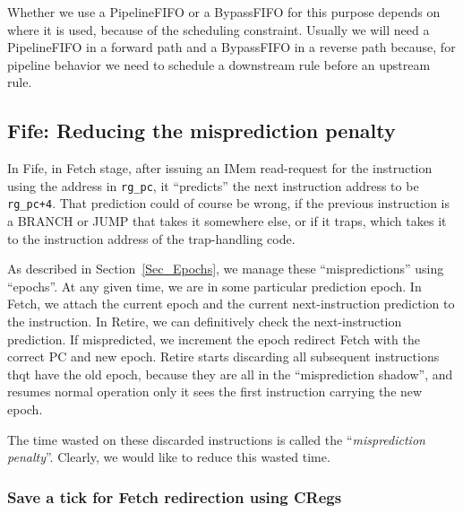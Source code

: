 Whether we use a PipelineFIFO or a BypassFIFO for this purpose depends
on where it is used, because of the scheduling constraint.  Usually we
will need a PipelineFIFO in a forward path and a BypassFIFO in a
reverse path because, for pipeline behavior we need to schedule a
downstream rule before an upstream rule.


\subsection{Fife: Reducing the misprediction penalty}

\label{Sec_misprediction_penalty}

In Fife, in Fetch stage, after issuing an IMem read-request for the
instruction using the address in \verb|rg_pc|, it ``predicts'' the
next instruction address to be \verb|rg_pc+4|.  That prediction could
of course be wrong, if the previous instruction is a BRANCH or JUMP
that takes it somewhere else, or if it traps, which takes it to the
instruction address of the trap-handling code.

As described in Section~\ref{Sec_Epochs}, we manage these
``mispredictions'' using ``epochs''.  At any given time, we are in
some particular prediction epoch.  In Fetch, we attach the current
epoch and the current next-instruction prediction to the
instruction. In Retire, we can definitively check the next-instruction
prediction.  If mispredicted, we increment the epoch redirect Fetch
with the correct PC and new epoch.  Retire starts discarding all
subsequent instructions thqt have the old epoch, because they are all
in the ``misprediction shadow'', and resumes normal operation only it
sees the first instruction carrying the new epoch.


The time wasted on these discarded instructions is called the
``\emph{misprediction penalty}''.  Clearly, we would like to reduce
this wasted time.


\subsubsection{Save a tick for Fetch redirection using CRegs}


